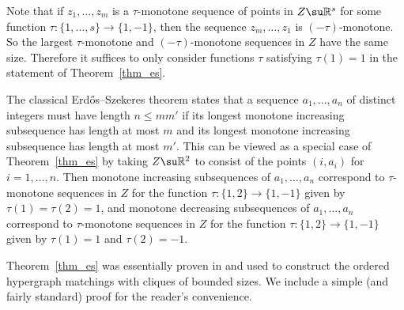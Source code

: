 Note that if $z_1, \ldots, z_m$ is a $\tau$-monotone sequence of points in $Z\su \mathbb{R}^s$ for some function $\tau: \{1,\dots,s\}\to \{1,-1\}$, then the sequence $z_m, \ldots, z_1$ is $(-\tau)$-monotone. So the largest $\tau$-monotone and $(-\tau)$-monotone sequences in $Z$ have the same size. Therefore it suffices to only consider functions $\tau$ satisfying $\tau(1)=1$ in the statement of Theorem~\ref{thm_es}.

The classical Erd{\H o}s--Szekeres theorem states that a sequence $a_1, \ldots, a_{n}$ of distinct integers must have length $n\le mm'$ if its longest monotone increasing subsequence has length at most $m$ and its longest monotone increasing subsequence has length at most $m'$. This can be viewed as a special case of Theorem~\ref{thm_es} by taking $Z\su \mathbb{R}^2$ to consist of the points $(i,a_i)$ for $i=1, \ldots, n$. Then monotone increasing subsequences of $a_1, \ldots, a_{n}$ correspond to $\tau$-monotone sequences in $Z$ for the function $\tau:\{1, 2\} \rightarrow \{1,-1\}$ given by $\tau(1)=\tau(2)=1$, and monotone decreasing subsequences of $a_1, \ldots, a_{n}$ correspond to $\tau$-monotone sequences in $Z$ for the function $\tau:\{1, 2\} \rightarrow \{1,-1\}$ given by $\tau(1)=1$ and $\tau(2)=-1$.

Theorem~\ref{thm_es} was essentially proven in \cite{DGR} and used to construct the ordered hypergraph matchings with cliques of bounded sizes. We include a simple (and fairly standard) proof for the reader's convenience.

